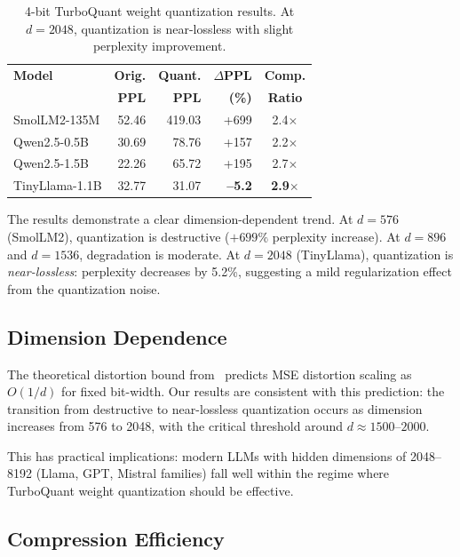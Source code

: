 \documentclass[11pt,twocolumn,letterpaper]{article}
\begin{document}
\begin{table}[h]
\centering
\small
\begin{tabular}{@{}lrrrc@{}}
\toprule
\textbf{Model} & \textbf{Orig.} & \textbf{Quant.} & \textbf{$\Delta$PPL} & \textbf{Comp.} \\
 & \textbf{PPL} & \textbf{PPL} & \textbf{(\%)} & \textbf{Ratio} \\
\midrule
SmolLM2-135M & 52.46 & 419.03 & +699 & 2.4$\times$ \\
Qwen2.5-0.5B & 30.69 & 78.76 & +157 & 2.2$\times$ \\
Qwen2.5-1.5B & 22.26 & 65.72 & +195 & 2.7$\times$ \\
TinyLlama-1.1B & 32.77 & 31.07 & \textbf{--5.2} & \textbf{2.9$\times$} \\
\bottomrule
\end{tabular}
\caption{4-bit TurboQuant weight quantization results. At $d = 2048$, quantization is near-lossless with slight perplexity improvement.}
\label{tab:results}
\end{table}

The results demonstrate a clear dimension-dependent trend. At $d = 576$ (SmolLM2), quantization is destructive ($+699\%$ perplexity increase). At $d = 896$ and $d = 1536$, degradation is moderate. At $d = 2048$ (TinyLlama), quantization is \textit{near-lossless}: perplexity decreases by 5.2\%, suggesting a mild regularization effect from the quantization noise.

\subsection{Dimension Dependence}

The theoretical distortion bound from~\cite{daliri2025turboquant} predicts MSE distortion scaling as $O(1/d)$ for fixed bit-width. Our results are consistent with this prediction: the transition from destructive to near-lossless quantization occurs as dimension increases from 576 to 2048, with the critical threshold around $d \approx 1500$--$2000$.

This has practical implications: modern LLMs with hidden dimensions of 2048--8192 (Llama, GPT, Mistral families) fall well within the regime where TurboQuant weight quantization should be effective.

\subsection{Compression Efficiency}
\end{document}
